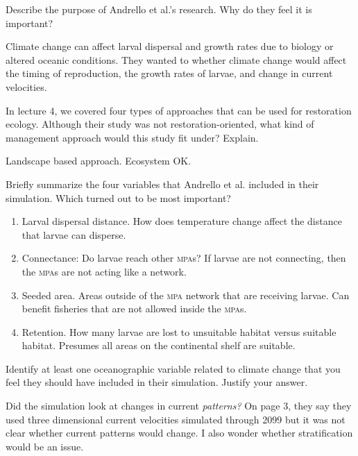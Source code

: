 \documentclass[12pt, addpoints]{exam}
\newcommand*\AnswerBox[2]{%
    \parbox[t][#1]{0.92\textwidth}{%
    \begin{solution}#2\end{solution}}
}
\newenvironment{AnswerPage}[1]
    {\begin{minipage}[t][#1]{0.92\textwidth}%
    \begin{solution}}
    {\end{solution}\end{minipage}
    \vspace*{\stretch{1}}}
\begin{document}
\begin{questions}

\question[5]
Describe the purpose of Andrello et al.'s research. Why do they feel it is important?


\AnswerBox{4\baselineskip}{%
Climate change can affect larval dispersal and growth rates due to biology or altered oceanic conditions. They wanted to whether climate change would affect the timing of reproduction, the growth rates of larvae, and change in current velocities.
}
\question[5]

In lecture 4, we covered four types of approaches that can be used for restoration ecology. Although their study was not restoration-oriented, what kind of management approach would this study fit under? Explain.

\AnswerBox{4\baselineskip}{%
Landscape based approach. Ecosystem OK.
}

\question[5]
Briefly summarize the four variables that Andrello et al. included in their simulation. Which turned out to be most important?
 
\begin{AnswerPage}{6\baselineskip}
\begin{enumerate}
	\item Larval dispersal distance. How does temperature change affect the distance that larvae can disperse.
	
	\item Connectance: Do larvae reach other \textsc{mpa}s? If larvae are not connecting, then the \textsc{mpa}s are not acting like a network.
	
	\item Seeded area. Areas outside of the \textsc{mpa} network that are receiving larvae. Can benefit fisheries that are not allowed inside the \textsc{mpa}s.
	
	\item Retention. How many larvae are lost to unsuitable habitat versus suitable habitat. Presumes all areas on the continental shelf are suitable.
\end{enumerate}
\end{AnswerPage}


\question[3]
Identify at least one oceanographic variable related to climate change that you feel they should have included in their simulation. Justify your answer.

\AnswerBox{4\baselineskip}{%
Did the simulation look at changes in current \textit{patterns?} On page 3, they say they used three dimensional current velocities simulated through 2099 but it was not clear whether current patterns would change. I also wonder whether stratification would be an issue.
}


\end{questions}
\end{document}
